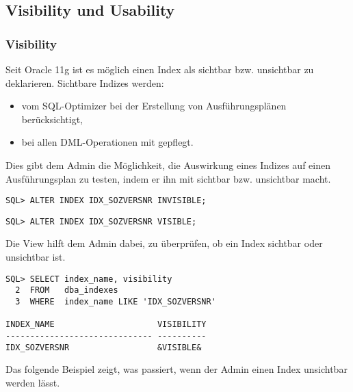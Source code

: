       \subsection{Visibility und Usability}
        \subsubsection{Visibility}
          Seit Oracle 11g ist es m\"oglich einen Index als sichtbar bzw. unsichtbar zu deklarieren. Sichtbare Indizes werden:
          \begin{itemize}
            \item vom SQL-Optimizer bei der Erstellung von Ausf\"uhrungspl\"anen ber\"ucksichtigt,
            \item bei allen DML-Operationen mit gepflegt.
          \end{itemize}
          Dies gibt dem Admin die M\"oglichkeit, die Auswirkung eines Indizes auf einen Ausf\"uhrungsplan zu testen, indem er ihn mit  sichtbar bzw. unsichtbar macht.
          \begin{lstlisting}[caption={Einen Index unsichtbar werden lassen},label=admin323,language=oracle_sql]
SQL> ALTER INDEX IDX_SOZVERSNR INVISIBLE;
          \end{lstlisting}

          \begin{lstlisting}[caption={Und so wird er wieder sichtbar},label=admin324,language=oracle_sql]
SQL> ALTER INDEX IDX_SOZVERSNR VISIBLE;
          \end{lstlisting}
          Die View  hilft dem Admin dabei, zu \"uberpr\"ufen, ob ein Index sichtbar oder unsichtbar ist.
          \begin{lstlisting}[caption={Ist der Index sichtbar oder unsichtbar?},label=admin325,language=oracle_sql]
SQL> SELECT index_name, visibility
  2  FROM   dba_indexes
  3  WHERE  index_name LIKE 'IDX_SOZVERSNR'

INDEX_NAME                     VISIBILITY
------------------------------ ----------
IDX_SOZVERSNR                  &VISIBLE&
          \end{lstlisting}
          Das folgende Beispiel zeigt, was passiert, wenn der Admin einen Index unsichtbar werden l\"asst.

